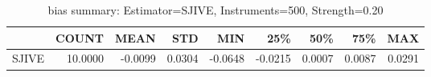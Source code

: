 \begin{table}[ht]
\centering
\caption{bias summary: Estimator=SJIVE, Instruments=500, Strength=0.20}
\begin{tabular}{lrrrrrrrr}
\toprule
 & COUNT & MEAN & STD & MIN & 25\% & 50\% & 75\% & MAX \\
\midrule
SJIVE & 10.0000 & -0.0099 & 0.0304 & -0.0648 & -0.0215 & 0.0007 & 0.0087 & 0.0291 \\
\bottomrule
\end{tabular}
\end{table}
